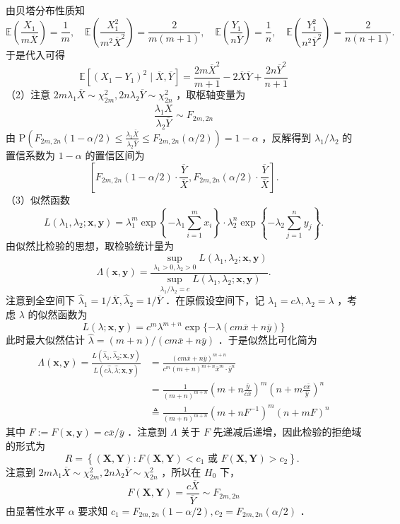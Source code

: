 \documentclass[UTF8,openany]{book}
\begin{document}
	由贝塔分布性质知
	$$
	\mathbb{E}\left(\frac{X_1}{m \overline{X}}\right)=\frac{1}{m}, \quad \mathbb{E}\left(\frac{X_1^2}{m^2 \overline{X}^2}\right)=\frac{2}{m(m+1)}, \quad \mathbb{E}\left(\frac{Y_1}{n \overline{Y}}\right)=\frac{1}{n}, \quad \mathbb{E}\left(\frac{Y_1^2}{n^2 \overline{Y}^2}\right)=\frac{2}{n(n+1)} .
	$$
	于是代入可得
	$$
	\mathbb{E}\left[\left(X_1-Y_1\right)^2 \mid \overline{X}, \overline{Y}\right]=\frac{2 m \overline{X}^2}{m+1}-2 \overline{X} \overline{Y}+\frac{2 n \overline{Y}^2}{n+1}
	$$
	（2）注意 $2 m \lambda_1 \overline{X} \sim \chi_{2 m}^2, 2 n \lambda_2 \overline{Y} \sim \chi_{2 n}^2$ ，取枢轴变量为
	$$
	\frac{\lambda_1 \overline{X}}{\lambda_2 \overline{Y}} \sim F_{2 m, 2 n}
	$$
	由 $\mathrm{P}\left(F_{2 m, 2 n}(1-\alpha / 2) \leq \frac{\lambda_1 \overline{X}}{\lambda_2 \overline{Y}} \leq F_{2 m, 2 n}(\alpha / 2)\right)=1-\alpha$ ，反解得到 $\lambda_1 / \lambda_2$ 的置信系数为 $1-\alpha$ 的置信区间为
	$$
	\left[F_{2 m, 2 n}(1-\alpha / 2) \cdot \frac{\overline{Y}}{\overline{X}}, F_{2 m, 2 n}(\alpha / 2) \cdot \frac{\overline{Y}}{\overline{X}}\right] .
	$$
	（3）似然函数
	$$
	L\left(\lambda_1, \lambda_2 ; \boldsymbol{x}, \boldsymbol{y}\right)=\lambda_1^m \exp \left\{-\lambda_1 \sum_{i=1}^m x_i\right\} \cdot \lambda_2^n \exp \left\{-\lambda_2 \sum_{j=1}^n y_j\right\} .
	$$
	由似然比检验的思想，取检验统计量为
	\[
	\Lambda(\boldsymbol{x}, \boldsymbol{y})=\frac{\sup _{\lambda_1>0, \lambda_2>0} L\left(\lambda_1, \lambda_2 ; \boldsymbol{x}, \boldsymbol{y}\right)}{\sup _{\lambda_1 / \lambda_2=c} L\left(\lambda_1, \lambda_2 ; \boldsymbol{x}, \boldsymbol{y}\right)} .
	\]
	注意到全空间下 $\hat{\lambda}_1=1 / \overline{X}, \hat{\lambda}_2=1 / \overline{Y}$ ．在原假设空间下，记 $\lambda_1=c \lambda, \lambda_2=\lambda$ ，考虑 $\lambda$ 的似然函数为
	$$
	L(\lambda ; \boldsymbol{x}, \boldsymbol{y})=c^m \lambda^{m+n} \exp \{-\lambda(c m \overline{x}+n \overline{y})\}
	$$
	此时最大似然估计 $\hat{\lambda}=(m+n) /(c m \overline{x}+n \overline{y})$ ．于是似然比可化简为
	$$
	\begin{aligned}
		\Lambda(\boldsymbol{x}, \boldsymbol{y})=\frac{L\left(\hat{\lambda}_1, \hat{\lambda}_2 ; \boldsymbol{x}, \boldsymbol{y}\right)}{L(c \hat{\lambda}, \hat{\lambda} ; \boldsymbol{x}, \boldsymbol{y})} & =\frac{(c m \overline{x}+n \overline{y})^{m+n}}{c^m(m+n)^{m+n} \overline{x}^m \cdot \overline{y}^n} \\
		& =\frac{1}{(m+n)^{m+n}}\left(m+n \frac{\overline{y}}{c \overline{x}}\right)^m\left(n+m \frac{c \overline{x}}{\overline{y}}\right)^n \\
		& \triangleq \frac{1}{(m+n)^{m+n}}\left(m+n F^{-1}\right)^m(n+m F)^n
	\end{aligned}
	$$
	其中 $F:=F(\boldsymbol{x}, \boldsymbol{y})=c \overline{x} / \overline{y}$ ．注意到 $\Lambda$ 关于 $F$ 先递减后递增，因此检验的拒绝域的形式为
	$$
	R=\left\{(\boldsymbol{X}, \boldsymbol{Y}): F(\boldsymbol{X}, \boldsymbol{Y})<c_1 \text { 或 } F(\boldsymbol{X}, \boldsymbol{Y})>c_2\right\} \text {. }
	$$
	注意到 $2 m \lambda_1 \overline{X} \sim \chi_{2 m}^2, 2 n \lambda_2 \overline{Y} \sim \chi_{2 n}^2$ ，所以在 $H_0$ 下，
	$$
	F(\boldsymbol{X}, \boldsymbol{Y})=\frac{c \overline{X}}{\overline{Y}} \sim F_{2 m, 2 n}
	$$
	由显著性水平 $\alpha$ 要求知 $c_1=F_{2 m, 2 n}(1-\alpha / 2), c_2=F_{2 m, 2 n}(\alpha / 2)$ ．	
	\newpage
\end{document}
